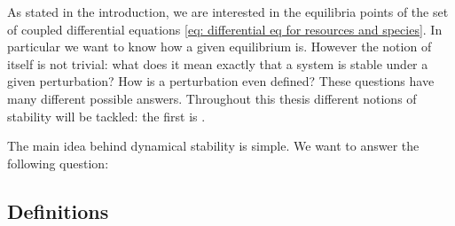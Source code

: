 \documentclass[12pt, titlepage]{report}
\begin{document}
As stated in the introduction, we are interested in the equilibria points of the set of coupled differential equations \eqref{eq: differential eq for resources and species}. In particular we want to know how  a given equilibrium is. However the notion of  itself is not trivial: what does it mean exactly that a system is stable under a given perturbation? How is a perturbation even defined? These questions have many different possible answers. Throughout this thesis different notions of stability will be tackled: the first is .

The main idea behind dynamical stability is simple. We want to answer the following question:

\begin{centering}
\end{centering}
\subsection{Definitions}
\end{document}
